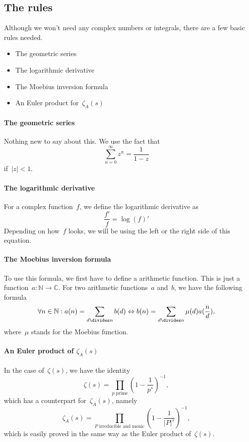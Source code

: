 \subsection{The rules}
Although we won't need any complex numbers or integrals, there are a few basic rules needed.
\begin{itemize}
  \item The geometric series
	\item The logarithmic derivative
	\item The Moebius inversion formula
  \item An Euler product for~$\zeta_A(s)$
\end{itemize}

\paragraph{The geometric series} Nothing new to say about this. We use the fact that
\begin{equation}
  \sum_{n=0}^\infty z^n = \frac{1}{1-z} 
\end{equation}
if~$|z| < 1$.

\paragraph{The logarithmic derivative}
For a complex function~$f$, we define the logarithmic derivative as
\begin{equation}
  \frac{f'}{f} = \log(f)'
\end{equation}
Depending on how~$f$ looks, we will be using the left or the right side of this equation.

\paragraph{The Moebius inversion formula} To use this formula, we first have to define a arithmetic function. This is just a function~$a\colon \mathbb{N} \rightarrow \mathbb{C}$. For two arithmetic functions~$a$ and~$b$, we have the following formula
\begin{equation}
  \forall n \in \mathbb{N}: a(n) = \sum_{d\divides n} b(d) \Leftrightarrow b(n) = \sum_{d\divides n} \mu(d)a(\frac{n}{d}),
\end{equation}
where~$\mu$ stands for the Moebius function.

\paragraph{An Euler product of $\zeta_A(s)$} In the case of~$\zeta(s)$, we have the identity
\begin{equation}
  \zeta(s) = \prod_{p \text{ prime}} \left( 1-\frac{1}{p^s} \right)^{-1}, 
\end{equation}
which has a counterpart for~$\zeta_A(s)$, namely
\begin{equation}
  \zeta_A(s) = \!\!\!\!\!\prod_{P \text{ irreducible and monic}}\left( 1-\frac{1}{|P|^s} \right)^{-1},
\end{equation}
which is easily proved in the same way as the Euler product of~$\zeta(s)$.

